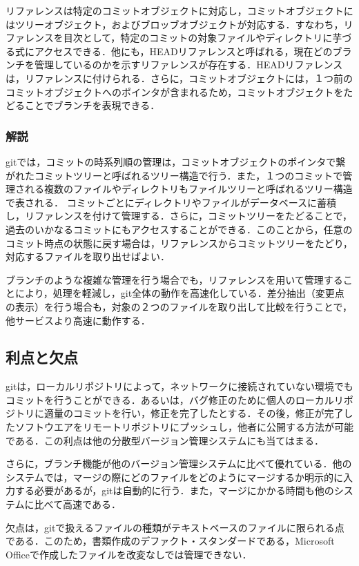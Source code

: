 \documentclass[a4j,9pt,twocolumn]{jsarticle}
\begin{document}
リファレンスは特定のコミットオブジェクトに対応し，コミットオブジェクトにはツリーオブジェクト，およびブロッブオブジェクトが対応する．すなわち，リファレンスを目次として，特定のコミットの対象ファイルやディレクトリに芋づる式にアクセスできる．他にも，HEADリファレンスと呼ばれる，現在どのブランチを管理しているのかを示すリファレンスが存在する．HEADリファレンスは，リファレンスに付けられる．さらに，コミットオブジェクトには，１つ前のコミットオブジェクトへのポインタが含まれるため，コミットオブジェクトをたどることでブランチを表現できる．

\subsubsection{解説}
gitでは，コミットの時系列順の管理は，コミットオブジェクトのポインタで繋がれたコミットツリーと呼ばれるツリー構造で行う．また，１つのコミットで管理される複数のファイルやディレクトリもファイルツリーと呼ばれるツリー構造で表される．
コミットごとにディレクトリやファイルがデータベースに蓄積し，リファレンスを付けて管理する．さらに，コミットツリーをたどることで，過去のいかなるコミットにもアクセスすることができる．このことから，任意のコミット時点の状態に戻す場合は，リファレンスからコミットツリーをたどり，対応するファイルを取り出せばよい．

ブランチのような複雑な管理を行う場合でも，リファレンスを用いて管理することにより，処理を軽減し，git全体の動作を高速化している．差分抽出（変更点の表示）を行う場合も，対象の２つのファイルを取り出して比較を行うことで，他サービスより高速に動作する．

\subsection{利点と欠点}
gitは，ローカルリポジトリによって，ネットワークに接続されていない環境でもコミットを行うことができる．あるいは，バグ修正のために個人のローカルリポジトリに適量のコミットを行い，修正を完了したとする．その後，修正が完了したソフトウエアをリモートリポジトリにプッシュし，他者に公開する方法が可能である．この利点は他の分散型バージョン管理システムにも当てはまる．

さらに，ブランチ機能が他のバージョン管理システムに比べて優れている．他のシステムでは，マージの際にどのファイルをどのようにマージするか明示的に入力する必要があるが，gitは自動的に行う．また，マージにかかる時間も他のシステムに比べて高速である．

欠点は，gitで扱えるファイルの種類がテキストベースのファイルに限られる点である．このため，書類作成のデファクト・スタンダードである，Microsoft Officeで作成したファイルを改変なしでは管理できない．
\end{document}
